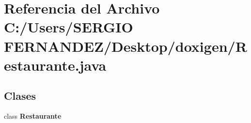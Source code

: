 \section{Referencia del Archivo C:/Users/SERGIO FERNANDEZ/Desktop/doxigen/Restaurante.java}
\label{_restaurante_8java}
\subsection*{Clases}
\begin{CompactItemize}
\item 
class {\bf Restaurante}
\end{CompactItemize}
